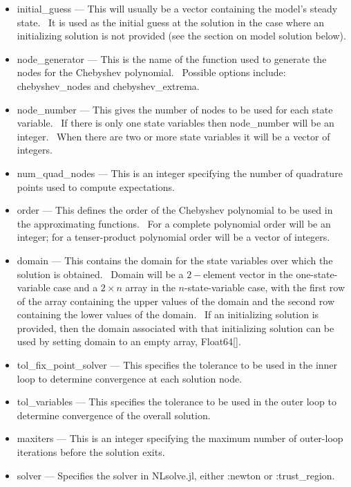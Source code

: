 \documentclass[notitlepage,11pt]{article}
\begin{document}
\begin{itemize}
\item initial\_guess --- This will usually be a vector containing the
model's steady state. \ It is used as the initial guess at the solution in
the case where an initializing solution is not provided (see the section on
model solution below).

\item node\_generator --- This is the name of the function used to generate
the nodes for the Chebyshev polynomial. \ Possible options include:
chebyshev\_nodes and chebyshev\_extrema.

\item node\_number --- This gives the number of nodes to be used for each
state variable. \ If there is only one state variables then node\_number
will be an integer. \ When there are two or more state variables it will be
a vector of integers.

\item num\_quad\_nodes --- This is an integer specifying the number of
quadrature points used to compute expectations.

\item order --- This defines the order of the Chebyshev polynomial to be
used in the approximating functions. \ For a complete polynomial order will
be an integer; for a tenser-product polynomial order will be a vector of
integers.

\item domain --- This contains the domain for the state variables over which
the solution is obtained. \ Domain will be a $2-$element vector in the
one-state-variable case and a $2\times n$ array in the $n$-state-variable
case, with the first row of the array containing the upper values of the
domain and the second row containing the lower values of the domain. \ If an
initializing solution is provided, then the domain associated with that
initializing solution can be used by setting domain to an empty array,
Float64[].

\item tol\_fix\_point\_solver --- This specifies the tolerance to be used in
the inner loop to determine convergence at each solution node.

\item tol\_variables --- This specifies the tolerance to be used in the
outer loop to determine convergence of the overall solution.

\item maxiters --- This is an integer specifying the maximum number of
outer-loop iterations before the solution exits.

\item solver --- Specifies the solver in NLsolve.jl, either :newton or
:trust\_region.
\end{itemize}
\end{document}
